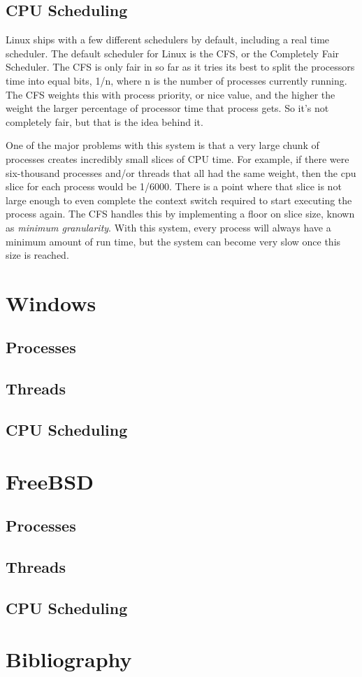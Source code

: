 \documentclass[10pt,letterpaper,onecolumn,draftclsnofoot]{IEEEtran}
\begin{document}
  \subsection{CPU Scheduling}
Linux ships with a few different schedulers by default, including a real time
scheduler.\cite{redhat2016} The default scheduler for Linux is the CFS, or
the Completely Fair Scheduler.
The CFS is only fair in so far as it tries its best to split the processors time
into equal bits, 1/n, where n is the number of processes currently running. The
CFS weights this with process priority, or nice value, and the higher the weight
the larger percentage of processor time that process gets. So it's not completely
fair, but that is the idea behind it.

One of the major problems with this system is that a very large chunk of processes
creates incredibly small slices of CPU time. For example, if there were six-thousand
processes and/or threads that all had the same weight, then the cpu slice for
each process would be 1/6000. There is a point where that slice is not large
enough to even complete the context switch required to start executing the process
again. The CFS handles this by implementing a floor on slice size, known as
\textit{minimum granularity}.\cite{robertlove2010} With this system, every process
will always have a minimum amount of run time, but the system can become very
slow once this size is reached.


\section{Windows}
  \subsection{Processes}
  \subsection{Threads}
  \subsection{CPU Scheduling}
\section{FreeBSD}
  \subsection{Processes}
  \subsection{Threads}
  \subsection{CPU Scheduling}

\clearpage
\section{Bibliography}



\end{document}
